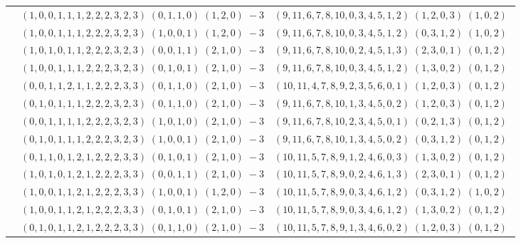 \documentclass[11pt]{article}
\begin{document}
\begin{longtable}[l]{|c|c|c|}
 \cline{2-3} 
 & $(1 ,0 ,0 ,1 ,1 ,1 ,2 ,2 ,2 ,3 ,2 ,3) \;(0 ,1 ,1 ,0) \;(1 ,2 ,0) \;-3$ & $(9 ,11 ,6 ,7 ,8 ,10 ,0 ,3 ,4 ,5 ,1 ,2) \;(1 ,2 ,0 ,3) \;(1 ,0 ,2) \;$\\ 
 \cline{2-3} 
 & $(1 ,0 ,0 ,1 ,1 ,1 ,2 ,2 ,2 ,3 ,2 ,3) \;(1 ,0 ,0 ,1) \;(1 ,2 ,0) \;-3$ & $(9 ,11 ,6 ,7 ,8 ,10 ,0 ,3 ,4 ,5 ,1 ,2) \;(0 ,3 ,1 ,2) \;(1 ,0 ,2) \;$\\ 
 \cline{2-3} 
 & $(1 ,0 ,1 ,0 ,1 ,1 ,2 ,2 ,2 ,3 ,2 ,3) \;(0 ,0 ,1 ,1) \;(2 ,1 ,0) \;-3$ & $(9 ,11 ,6 ,7 ,8 ,10 ,0 ,2 ,4 ,5 ,1 ,3) \;(2 ,3 ,0 ,1) \;(0 ,1 ,2) \;$\\ 
 \cline{2-3} 
 & $(1 ,0 ,0 ,1 ,1 ,1 ,2 ,2 ,2 ,3 ,2 ,3) \;(0 ,1 ,0 ,1) \;(2 ,1 ,0) \;-3$ & $(9 ,11 ,6 ,7 ,8 ,10 ,0 ,3 ,4 ,5 ,1 ,2) \;(1 ,3 ,0 ,2) \;(0 ,1 ,2) \;$\\ 
 \cline{2-3} 
 & $(0 ,0 ,1 ,1 ,2 ,1 ,1 ,2 ,2 ,2 ,3 ,3) \;(0 ,1 ,1 ,0) \;(2 ,1 ,0) \;-3$ & $(10 ,11 ,4 ,7 ,8 ,9 ,2 ,3 ,5 ,6 ,0 ,1) \;(1 ,2 ,0 ,3) \;(0 ,1 ,2) \;$\\ 
 \cline{2-3} 
 & $(0 ,1 ,0 ,1 ,1 ,1 ,2 ,2 ,2 ,3 ,2 ,3) \;(0 ,1 ,1 ,0) \;(2 ,1 ,0) \;-3$ & $(9 ,11 ,6 ,7 ,8 ,10 ,1 ,3 ,4 ,5 ,0 ,2) \;(1 ,2 ,0 ,3) \;(0 ,1 ,2) \;$\\ 
 \cline{2-3} 
 & $(0 ,0 ,1 ,1 ,1 ,1 ,2 ,2 ,2 ,3 ,2 ,3) \;(1 ,0 ,1 ,0) \;(2 ,1 ,0) \;-3$ & $(9 ,11 ,6 ,7 ,8 ,10 ,2 ,3 ,4 ,5 ,0 ,1) \;(0 ,2 ,1 ,3) \;(0 ,1 ,2) \;$\\ 
 \cline{2-3} 
 & $(0 ,1 ,0 ,1 ,1 ,1 ,2 ,2 ,2 ,3 ,2 ,3) \;(1 ,0 ,0 ,1) \;(2 ,1 ,0) \;-3$ & $(9 ,11 ,6 ,7 ,8 ,10 ,1 ,3 ,4 ,5 ,0 ,2) \;(0 ,3 ,1 ,2) \;(0 ,1 ,2) \;$\\ 
 \cline{2-3} 
 & $(0 ,1 ,1 ,0 ,1 ,2 ,1 ,2 ,2 ,2 ,3 ,3) \;(0 ,1 ,0 ,1) \;(2 ,1 ,0) \;-3$ & $(10 ,11 ,5 ,7 ,8 ,9 ,1 ,2 ,4 ,6 ,0 ,3) \;(1 ,3 ,0 ,2) \;(0 ,1 ,2) \;$\\ 
 \cline{2-3} 
 & $(1 ,0 ,1 ,0 ,1 ,2 ,1 ,2 ,2 ,2 ,3 ,3) \;(0 ,0 ,1 ,1) \;(2 ,1 ,0) \;-3$ & $(10 ,11 ,5 ,7 ,8 ,9 ,0 ,2 ,4 ,6 ,1 ,3) \;(2 ,3 ,0 ,1) \;(0 ,1 ,2) \;$\\ 
 \cline{2-3} 
 & $(1 ,0 ,0 ,1 ,1 ,2 ,1 ,2 ,2 ,2 ,3 ,3) \;(1 ,0 ,0 ,1) \;(1 ,2 ,0) \;-3$ & $(10 ,11 ,5 ,7 ,8 ,9 ,0 ,3 ,4 ,6 ,1 ,2) \;(0 ,3 ,1 ,2) \;(1 ,0 ,2) \;$\\ 
 \cline{2-3} 
 & $(1 ,0 ,0 ,1 ,1 ,2 ,1 ,2 ,2 ,2 ,3 ,3) \;(0 ,1 ,0 ,1) \;(2 ,1 ,0) \;-3$ & $(10 ,11 ,5 ,7 ,8 ,9 ,0 ,3 ,4 ,6 ,1 ,2) \;(1 ,3 ,0 ,2) \;(0 ,1 ,2) \;$\\ 
 \cline{2-3} 
 & $(0 ,1 ,0 ,1 ,1 ,2 ,1 ,2 ,2 ,2 ,3 ,3) \;(0 ,1 ,1 ,0) \;(2 ,1 ,0) \;-3$ & $(10 ,11 ,5 ,7 ,8 ,9 ,1 ,3 ,4 ,6 ,0 ,2) \;(1 ,2 ,0 ,3) \;(0 ,1 ,2) \;$\\ 

\end{longtable}
\end{document}
